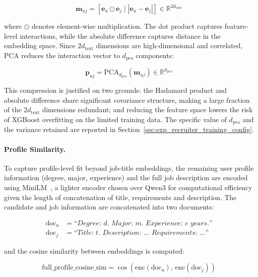 \begin{equation}
    \mathbf{m}_{uj} = \left[\mathbf{e}_u \odot \mathbf{e}_j \;\Big|\; 
    |\mathbf{e}_u - \mathbf{e}_j|\right] \in \mathbb{R}^{2d_{\text{text}}}
\end{equation}

where $\odot$ denotes element-wise multiplication. The dot product captures 
feature-level interactions, while the absolute difference captures distance 
in the embedding space. Since $2d_{\text{text}}$ dimensions are 
high-dimensional and correlated, \gls{PCA} reduces the interaction vector 
to $d_{\text{pca}}$ components:

\begin{equation}
    \mathbf{p}_{uj} = \text{PCA}_{d_{\text{pca}}}(\mathbf{m}_{uj}) 
    \in \mathbb{R}^{d_{\text{pca}}}
\end{equation}

This compression is justified on two grounds: the Hadamard product 
and absolute difference share significant covariance structure, making 
a large fraction of the $2d_{\text{text}}$ dimensions redundant; and 
reducing the feature space lowers the risk of XGBoost overfitting on 
the limited training data. The specific value of $d_{\text{pca}}$ and 
the variance retained are reported in Section~\ref{sec:exp_recruiter_training_config}.

\paragraph{Profile Similarity.} To capture profile-level fit beyond 
job-title embeddings, the remaining user profile information (degree, 
major, experience) and the full job description are encoded using 
MiniLM~\cite{minilm}, a lighter encoder chosen over Qwen3 for 
computational efficiency given the length of concatenation of title, requirements and description. The candidate and job information are concatenated into two documents:

\begin{align}
    \text{doc}_u &= \textit{``Degree: } d\textit{. Major: } m\textit{. Experience: } e\textit{ years.''} \\
    \text{doc}_j &= \textit{``Title: } t\textit{. Description: \ldots{} Requirements: \ldots''}
\end{align}

and the cosine similarity between embeddings is computed:

\begin{equation}
    \text{full\_profile\_cosine\_sim} = \cos\!\left(\text{enc}(\text{doc}_u),\, \text{enc}(\text{doc}_j)\right)
\end{equation}

